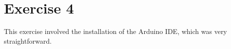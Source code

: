 \part*{Exercise 4}
This exercise involved the installation of the Arduino IDE, which was very straightforward.
